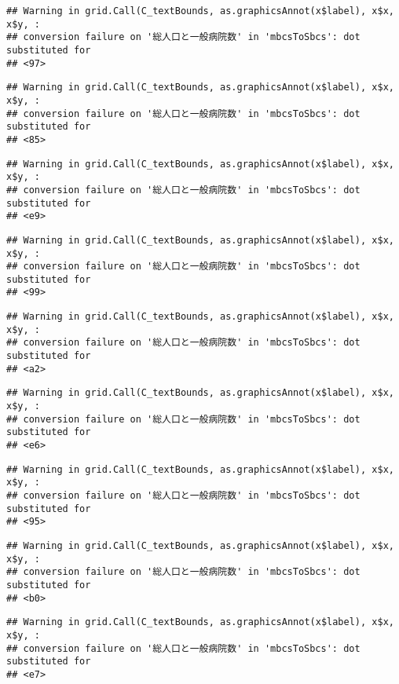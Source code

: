 \documentclass[
]{article}
\begin{document}
\begin{verbatim}
## Warning in grid.Call(C_textBounds, as.graphicsAnnot(x$label), x$x, x$y, :
## conversion failure on '総人口と一般病院数' in 'mbcsToSbcs': dot substituted for
## <97>
\end{verbatim}

\begin{verbatim}
## Warning in grid.Call(C_textBounds, as.graphicsAnnot(x$label), x$x, x$y, :
## conversion failure on '総人口と一般病院数' in 'mbcsToSbcs': dot substituted for
## <85>
\end{verbatim}

\begin{verbatim}
## Warning in grid.Call(C_textBounds, as.graphicsAnnot(x$label), x$x, x$y, :
## conversion failure on '総人口と一般病院数' in 'mbcsToSbcs': dot substituted for
## <e9>
\end{verbatim}

\begin{verbatim}
## Warning in grid.Call(C_textBounds, as.graphicsAnnot(x$label), x$x, x$y, :
## conversion failure on '総人口と一般病院数' in 'mbcsToSbcs': dot substituted for
## <99>
\end{verbatim}

\begin{verbatim}
## Warning in grid.Call(C_textBounds, as.graphicsAnnot(x$label), x$x, x$y, :
## conversion failure on '総人口と一般病院数' in 'mbcsToSbcs': dot substituted for
## <a2>
\end{verbatim}

\begin{verbatim}
## Warning in grid.Call(C_textBounds, as.graphicsAnnot(x$label), x$x, x$y, :
## conversion failure on '総人口と一般病院数' in 'mbcsToSbcs': dot substituted for
## <e6>
\end{verbatim}

\begin{verbatim}
## Warning in grid.Call(C_textBounds, as.graphicsAnnot(x$label), x$x, x$y, :
## conversion failure on '総人口と一般病院数' in 'mbcsToSbcs': dot substituted for
## <95>
\end{verbatim}

\begin{verbatim}
## Warning in grid.Call(C_textBounds, as.graphicsAnnot(x$label), x$x, x$y, :
## conversion failure on '総人口と一般病院数' in 'mbcsToSbcs': dot substituted for
## <b0>
\end{verbatim}

\begin{verbatim}
## Warning in grid.Call(C_textBounds, as.graphicsAnnot(x$label), x$x, x$y, :
## conversion failure on '総人口と一般病院数' in 'mbcsToSbcs': dot substituted for
## <e7>
\end{verbatim}
\end{document}

